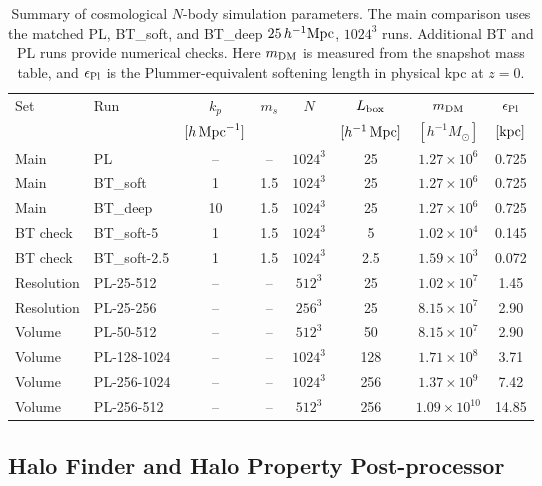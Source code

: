 \documentclass[
 reprint,
 superscriptaddress,
 nofootinbib,
 nobibnotes,
 amsmath,
 amssymb,
 aps,
 prd,
 floatfix,
 longbibliography
]{revtex4-2}
\begin{document}
\begin{table}[t]
\caption{Summary of cosmological \(N\)-body simulation parameters. The main comparison uses the matched PL, BT\_soft, and BT\_deep \(25\,h^{-1}{\rm Mpc}\), \(1024^3\) runs. Additional BT and PL runs provide numerical checks. Here \(m_{\rm DM}\) is measured from the snapshot mass table, and \(\epsilon_{\rm Pl}\) is the Plummer-equivalent softening length in physical kpc at \(z=0\).}
\label{tab:simulation_parameters}
\centering
\begin{ruledtabular}
\begin{tabular}{llcccccc}
Set & Run & \(k_p\) & \(m_s\) & \(N\) & \(L_{\rm box}\) & \(m_{\rm DM}\) & \(\epsilon_{\rm Pl}\) \\
 & & \([h\,{\rm Mpc}^{-1}]\) & & & \([h^{-1}\,{\rm Mpc}]\) & \([h^{-1}M_\odot]\) & \([{\rm kpc}]\) \\
\colrule
Main & PL & -- & -- & \(1024^3\) & 25 & \(1.27\times 10^6\) & 0.725 \\
Main & BT\_soft & 1 & 1.5 & \(1024^3\) & 25 & \(1.27\times 10^6\) & 0.725 \\
Main & BT\_deep & 10 & 1.5 & \(1024^3\) & 25 & \(1.27\times 10^6\) & 0.725 \\
BT check & BT\_soft-5 & 1 & 1.5 & \(1024^3\) & 5 & \(1.02\times 10^4\) & 0.145 \\
BT check & BT\_soft-2.5 & 1 & 1.5 & \(1024^3\) & 2.5 & \(1.59\times 10^3\) & 0.072 \\
Resolution & PL-25-512 & -- & -- & \(512^3\) & 25 & \(1.02\times 10^7\) & 1.45 \\
Resolution & PL-25-256 & -- & -- & \(256^3\) & 25 & \(8.15\times 10^7\) & 2.90 \\
Volume & PL-50-512 & -- & -- & \(512^3\) & 50 & \(8.15\times 10^7\) & 2.90 \\
Volume & PL-128-1024 & -- & -- & \(1024^3\) & 128 & \(1.71\times 10^8\) & 3.71 \\
Volume & PL-256-1024 & -- & -- & \(1024^3\) & 256 & \(1.37\times 10^9\) & 7.42 \\
Volume & PL-256-512 & -- & -- & \(512^3\) & 256 & \(1.09\times 10^{10}\) & 14.85 \\
\end{tabular}
\end{ruledtabular}
\end{table}



\subsection{Halo Finder and Halo Property Post-processor}
\end{document}

